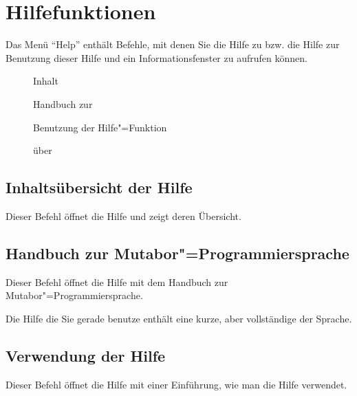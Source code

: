 {
\section{Hilfefunktionen}\label{sec:MS_HELP}
Das Menü "`Help"' enthält Befehle, mit denen Sie die Hilfe zu
\mutabor{} bzw. die Hilfe zur Benutzung dieser Hilfe und ein
Informationsfenster zu  \mutabor{} aufrufen
können.


\begin{description}
\item[] Inhalt
\item[] Handbuch zur
\item[] Benutzung der Hilfe"=Funktion
\item[] über \mutabor{}
\end{description}

\subsection{Inhaltsübersicht der Hilfe}
\label{sec:MI_HELPINDEX}

Dieser Befehl öffnet die Hilfe und zeigt deren Übersicht.

\subsection{Handbuch zur Mutabor"=Programmiersprache}
\label{sec:MI_HELPHANDBOOK}

Dieser Befehl öffnet die Hilfe mit dem Handbuch zur
Mutabor"=Programmiersprache.


Die Hilfe die Sie gerade benutze enthält eine kurze, aber vollständige
 der Sprache.

\subsection{Verwendung der Hilfe}\label{sec:MI_HELPONHELP}



Dieser Befehl öffnet die Hilfe mit einer Einführung, wie 
man die Hilfe verwendet.


}
